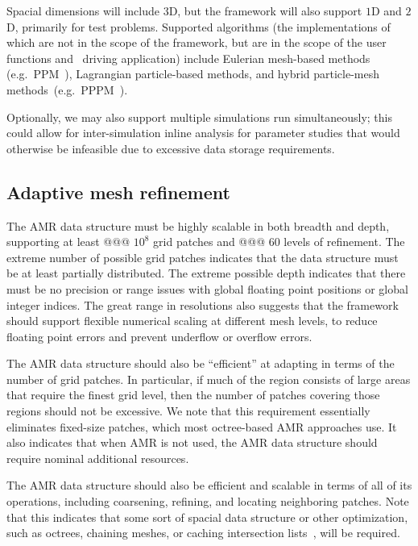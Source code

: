 \documentclass[10pt,twocolumn]{article}
\begin{document}
Spacial dimensions will include $3$D, but the framework will also
support $1$D and $2$D, primarily for test problems.  Supported
algorithms (the implementations of which are not in the scope of the
framework, but are in the scope of the user functions and \enzoii\
driving application) include Eulerian mesh-based methods
(e.g.~PPM~\cite{WoCo84b}), Lagrangian particle-based methods, and
hybrid particle-mesh methods~(e.g.~PPPM~\cite{HoEa88}).

Optionally, we may also support multiple simulations run
simultaneously; this could allow for inter-simulation inline analysis
for parameter studies that would otherwise be infeasible due to
excessive data storage requirements.


\subsection{Adaptive mesh refinement} \label{ss:require-amr}

The AMR data structure must be highly scalable in both breadth and
depth, supporting at least @@@ $10^8$ grid patches and @@@ $60$ levels
of refinement.  The extreme number of possible grid patches indicates
that the data structure must be at least partially distributed.  The
extreme possible depth indicates that there must be no precision or
range issues with global floating point positions or global integer
indices.  The great range in resolutions also suggests that the
framework should support flexible numerical scaling at different mesh
levels, to reduce floating point errors and prevent underflow or
overflow errors.

The AMR data structure should also be ``efficient'' at adapting in
terms of the number of grid patches.  In particular, if much of the
region consists of large areas that require the finest grid level,
then the number of patches covering those regions should not be
excessive.  We note that this requirement essentially eliminates
fixed-size patches, which most octree-based AMR approaches use.  It
also indicates that when AMR is not used, the AMR data structure should
require nominal additional resources.

The AMR data structure should also be efficient and scalable in terms
of all of its operations, including coarsening, refining, and locating
neighboring patches.  Note that this indicates that some sort of
spacial data structure or other optimization, such as octrees,
chaining meshes, or caching intersection lists~\cite{StSh09}, will be
required.
\end{document}
